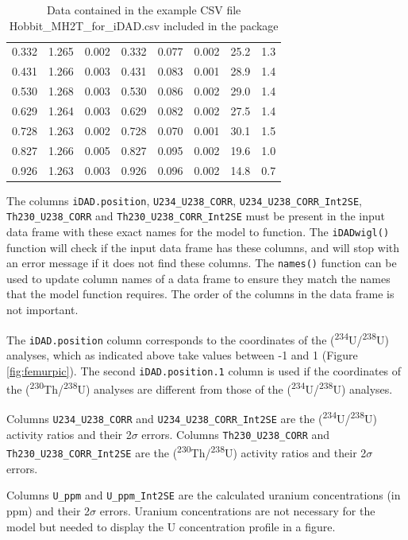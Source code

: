 \documentclass[]{elsarticle} %
\begin{document}
\begin{table}[ht]
\begin{tabular}{cccccccc}
  0.332 & 1.265 & 0.002 & 0.332 & 0.077 & 0.002 & 25.2 & 1.3 \\ 
  0.431 & 1.266 & 0.003 & 0.431 & 0.083 & 0.001 & 28.9 & 1.4 \\ 
  0.530 & 1.268 & 0.003 & 0.530 & 0.086 & 0.002 & 29.0 & 1.4 \\ 
  0.629 & 1.264 & 0.003 & 0.629 & 0.082 & 0.002 & 27.5 & 1.4 \\ 
  0.728 & 1.263 & 0.002 & 0.728 & 0.070 & 0.001 & 30.1 & 1.5 \\ 
  0.827 & 1.266 & 0.005 & 0.827 & 0.095 & 0.002 & 19.6 & 1.0 \\ 
  0.926 & 1.263 & 0.003 & 0.926 & 0.096 & 0.002 & 14.8 & 0.7 \\ 
   \hline
\end{tabular}
\caption{\label{tab:hobbitone}Data contained in the example CSV file Hobbit\_MH2T\_for\_iDAD.csv included in the package} 
\end{table}

The columns \texttt{iDAD.position}, \texttt{U234\_U238\_CORR}, \texttt{U234\_U238\_CORR\_Int2SE}, \texttt{Th230\_U238\_CORR} and \texttt{Th230\_U238\_CORR\_Int2SE} must be present in the input data frame with these exact names for the model to function. The \texttt{iDADwigl()} function will check if the input data frame has these columns, and will stop with an error message if it does not find these columns. The \texttt{names()} function can be used to update column names of a data frame to ensure they match the names that the model function requires. The order of the columns in the data frame is not important.

The \texttt{iDAD.position} column corresponds to the coordinates of the (\textsuperscript{234}U/\textsuperscript{238}U) analyses, which as indicated above take values between -1 and 1 (Figure \ref{fig:femurpic}). The second \texttt{iDAD.position.1} column is used if the coordinates of the (\textsuperscript{230}Th/\textsuperscript{238}U) analyses are different from those of the (\textsuperscript{234}U/\textsuperscript{238}U) analyses.

Columns \texttt{U234\_U238\_CORR} and \texttt{U234\_U238\_CORR\_Int2SE} are the (\textsuperscript{234}U/\textsuperscript{238}U) activity ratios and their 2\(\sigma\) errors. Columns \texttt{Th230\_U238\_CORR} and
\texttt{Th230\_U238\_CORR\_Int2SE} are the (\textsuperscript{230}Th/\textsuperscript{238}U) activity ratios and their 2\(\sigma\) errors.

Columns \texttt{U\_ppm} and \texttt{U\_ppm\_Int2SE} are the calculated uranium concentrations (in ppm) and their 2\(\sigma\) errors. Uranium concentrations are not necessary for the model but needed to display the U concentration profile in a figure.
\end{document}
